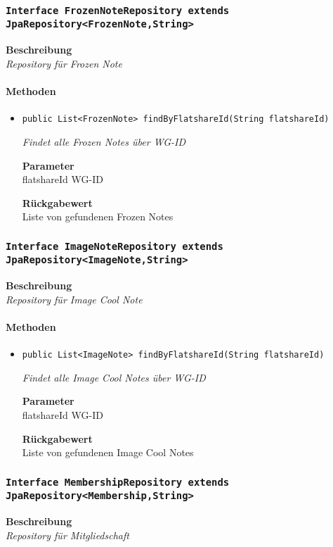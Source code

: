     \subsubsection{\texttt{Interface FrozenNoteRepository extends JpaRepository<FrozenNote,String>}}
    \textbf{Beschreibung} \\
    \textit{Repository für Frozen Note}
    \paragraph*{Methoden}
    \begin{itemize}
    	\item{\texttt{public List<FrozenNote> findByFlatshareId(String flatshareId)}}
    	
    	\textit{Findet alle Frozen Notes über WG-ID}
    	
    	\textbf{Parameter} \\
    	flatshareId WG-ID
    	
    	\textbf{Rückgabewert} \\
    	Liste von gefundenen Frozen Notes
    \end{itemize}
    \subsubsection{\texttt{Interface ImageNoteRepository extends JpaRepository<ImageNote,String>}}
    \textbf{Beschreibung} \\
    \textit{Repository für Image Cool Note}
    \paragraph*{Methoden}
    \begin{itemize}
    	\item{\texttt{public List<ImageNote> findByFlatshareId(String flatshareId)}}
    	
    	\textit{Findet alle Image Cool Notes über WG-ID}
    	
    	\textbf{Parameter} \\
    	flatshareId WG-ID
    	
    	\textbf{Rückgabewert} \\
    	Liste von gefundenen Image Cool Notes
    \end{itemize}
    \subsubsection{\texttt{Interface MembershipRepository extends JpaRepository<Membership,String>}}
    \textbf{Beschreibung} \\
    \textit{Repository für Mitgliedschaft}
